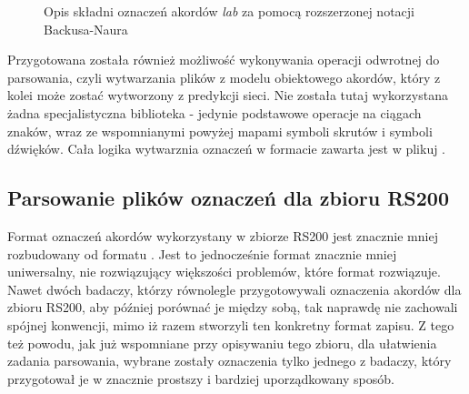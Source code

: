 \begin{figure}
    \centering
    \caption{Opis składni oznaczeń akordów \emph{lab} za pomocą rozszerzonej notacji Backusa-Naura}
    \label{fig:lab_syntax}
    {\scriptsize }
\end{figure}

Przygotowana została również możliwość wykonywania operacji odwrotnej do parsowania, czyli
wytwarzania plików  z modelu obiektowego akordów, który z kolei może zostać wytworzony z
predykcji sieci. Nie została tutaj wykorzystana żadna specjalistyczna biblioteka - jedynie
podstawowe operacje na ciągach znaków, wraz ze wspomnianymi powyżej mapami symboli skrutów i symboli
dźwięków. Cała logika wytwarznia oznaczeń w formacie  zawarta jest w plikuj
.

\subsection{Parsowanie plików oznaczeń dla zbioru RS200}

Format oznaczeń akordów wykorzystany w zbiorze RS200 jest znacznie mniej rozbudowany od formatu
. Jest to jednocześnie format znacznie mniej uniwersalny, nie rozwiązujący większości
problemów, które format  rozwiązuje. Nawet dwóch badaczy, którzy równolegle przygotowywali
oznaczenia akordów dla zbioru RS200, aby później porównać je między sobą, tak naprawdę nie zachowali
spójnej konwencji, mimo iż razem stworzyli ten konkretny format zapisu. Z tego też powodu, jak już
wspomniane przy opisywaniu tego zbioru, dla ułatwienia zadania parsowania, wybrane zostały
oznaczenia tylko jednego z badaczy, który przygotował je w znacznie prostszy i bardziej
uporządkowany sposób.

